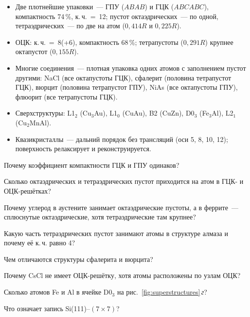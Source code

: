 \begin{itogi}
\begin{itemize}
\item Две плотнейшие упаковки~— ГПУ ($ABAB$) и ГЦК ($ABCABC$), компактность
74\,\%, к.\,ч.~=~12; пустот октаэдрических~— по одной, тетраэдрических~— по
две на атом ($0{,}414R$ и $0{,}225R$).
\item ОЦК: к.\,ч.~=~8(+6), компактность 68\,\%; тетрапустоты ($0{,}291R$) крупнее
октапустот ($0{,}155R$).
\item Многие соединения~— плотная упаковка одних атомов с заполнением
пустот другими: NaCl (все октапустоты ГЦК), сфалерит (половина тетрапустот
ГЦК), вюрцит (половина тетрапустот ГПУ), NiAs (все октапустоты ГПУ),
флюорит (все тетрапустоты ГЦК).
\item Сверхструктуры: L1$_2$ (Cu$_3$Au), L1$_0$ (CuAu), B2 (CuZn), D0$_3$
(Fe$_3$Al), L2$_1$ (Cu$_2$MnAl).
\item Квазикристаллы~— дальний порядок без трансляций (оси 5, 8, 10, 12);
поверхность релаксирует и реконструируется.
\end{itemize}
\end{itogi}

\begin{proverka}
\item Почему коэффициент компактности ГЦК и ГПУ одинаков?
\item Сколько октаэдрических и тетраэдрических пустот приходится на атом в
ГЦК- и ОЦК-решётках?
\item Почему углерод в аустените занимает октаэдрические пустоты, а в
феррите~— сплюснутые октаэдрические, хотя тетраэдрические там крупнее?
\item Какую часть тетраэдрических пустот занимают атомы в структуре алмаза
и почему её к.\,ч. равно 4?
\item Чем отличаются структуры сфалерита и вюрцита?
\item Почему CsCl не имеет ОЦК-решётку, хотя атомы расположены по узлам ОЦК?
\item Сколько атомов Fe и Al в ячейке D0$_3$ на рис.~\ref{fig:superstructures}\,\textit{г}?
\item Что означает запись Si(111)--$(7\times7)$?
\end{proverka}
